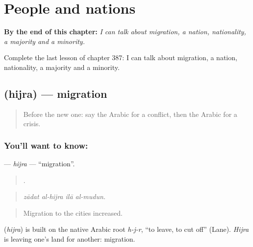 
\chapter{People and nations}
\label{ch:ar-people-and-nations}

\begin{chapteropening}
\textbf{By the end of this chapter:} \emph{I can talk about migration, a nation, nationality, a majority and a minority.}

Complete the last lesson of chapter 387: I can talk about migration, a nation, nationality, a majority and a minority.
\end{chapteropening}

\section[\texorpdfstring{\ar{هجرة} (hijra)}{هجرة (hijra)}]{ (hijra) — migration}

\label{lesson:AR-C387-hijra}



\begin{quote}
Before the new one: say the Arabic for a conflict, then the Arabic for a crisis.
\end{quote}

\subsection*{You'll want to know: }
\textbf{} — \emph{hijra} — \textquotedblleft{}migration\textquotedblright{}.

\begin{quote}
   .
\end{quote}

\begin{quote}
\emph{zādat al-hijra ilā al-mudun.}
\end{quote}

\begin{quote}
Migration to the cities increased.
\end{quote}

\begin{cousinweb}
\textbf{} (\emph{hijra}) is built on the native Arabic root \emph{h-j-r}, \textquotedblleft{}to leave, to cut off\textquotedblright{} (Lane). \emph{Hijra} is leaving one's land for another: migration.
\end{cousinweb}

